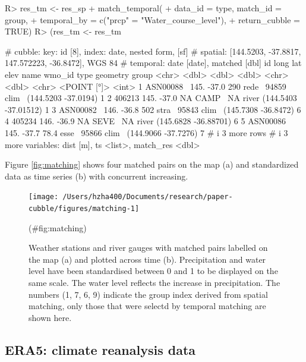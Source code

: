 \documentclass[
]{jss}
\begin{document}
\begin{CodeChunk}
\begin{CodeInput}
R> res_tm <- res_sp %
+   match_temporal(
+     data_id = type, match_id = group,
+     temporal_by = c("prcp" = "Water_course_level"),
+     return_cubble = TRUE)
R> (res_tm <- res_tm %
\end{CodeInput}
\begin{CodeOutput}
# cubble:   key: id [8], index: date, nested form, [sf]
# spatial:  [144.5203, -37.8817, 147.572223, -36.8472], WGS 84
# temporal: date [date], matched [dbl]
  id         long   lat  elev name  wmo_id type              geometry group
  <chr>     <dbl> <dbl> <dbl> <chr>  <dbl> <chr>          <POINT [°]> <int>
1 ASN00088~  145. -37.0 290   rede~  94859 clim~  (144.5203 -37.0194)     1
2 406213     145. -37.0  NA   CAMP~     NA river (144.5403 -37.01512)     1
3 ASN00082~  146. -36.8 502   stra~  95843 clim~  (145.7308 -36.8472)     6
4 405234     146. -36.9  NA   SEVE~     NA river (145.6828 -36.88701)     6
5 ASN00086~  145. -37.7  78.4 esse~  95866 clim~  (144.9066 -37.7276)     7
# i 3 more rows
# i 3 more variables: dist [m], ts <list>, match_res <dbl>
\end{CodeOutput}
\end{CodeChunk}

Figure \ref{fig:matching} shows four matched pairs on the map (a) and
standardized data as time series (b) with concurrent increasing.

\begin{CodeChunk}
\begin{figure}

{\centering \texttt{[image: /Users/hzha400/Documents/research/paper-cubble/figures/matching-1]} 

}

\caption[Weather stations and river gauges with matched pairs labelled on the map (a) and plotted across time (b)]{Weather stations and river gauges with matched pairs labelled on the map (a) and plotted across time (b). Precipitation and water level have been standardised between 0 and 1 to be displayed on the same scale. The water level reflects the increase in precipitation. The numbers (1, 7, 6, 9) indicate the group index derived from spatial matching, only those that were selectd by temporal matching are shown here.}(\#fig:matching)
\end{figure}
\end{CodeChunk}

\hypertarget{era5-climate-reanalysis-data}{%
\subsection{ERA5: climate reanalysis
data}\label{era5-climate-reanalysis-data}}
\end{document}
